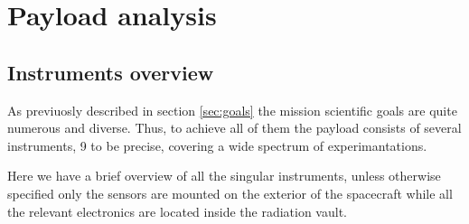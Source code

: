 \section{Payload analysis}
\label{sec:payload}

\subsection{Instruments overview}
As previuosly described in section \ref{sec:goals} the mission scientific goals are 
quite numerous and diverse. Thus, to achieve all of them the payload consists of 
several instruments, 9 to be precise, covering a wide spectrum of experimantations.


Here we have a brief overview of all the singular instruments, unless otherwise 
specified only the sensors are mounted on the exterior of the spacecraft while all 
the relevant electronics are located inside the radiation vault. 

